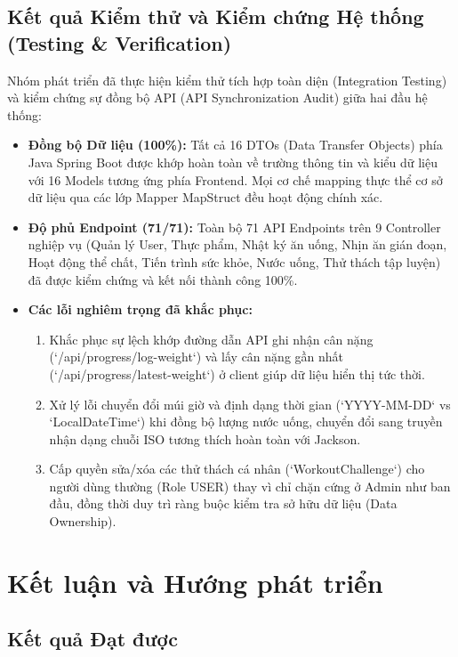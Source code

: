 \documentclass[12pt,a4paper]{article}
\begin{document}
\subsection{Kết quả Kiểm thử và Kiểm chứng Hệ thống (Testing \& Verification)}

Nhóm phát triển đã thực hiện kiểm thử tích hợp toàn diện (Integration Testing) và kiểm chứng sự đồng bộ API (API Synchronization Audit) giữa hai đầu hệ thống:
\begin{itemize}
    \item \textbf{Đồng bộ Dữ liệu (100\%):} Tất cả 16 DTOs (Data Transfer Objects) phía Java Spring Boot được khớp hoàn toàn về trường thông tin và kiểu dữ liệu với 16 Models tương ứng phía Frontend. Mọi cơ chế mapping thực thể cơ sở dữ liệu qua các lớp Mapper MapStruct đều hoạt động chính xác.
    \item \textbf{Độ phủ Endpoint (71/71):} Toàn bộ 71 API Endpoints trên 9 Controller nghiệp vụ (Quản lý User, Thực phẩm, Nhật ký ăn uống, Nhịn ăn gián đoạn, Hoạt động thể chất, Tiến trình sức khỏe, Nước uống, Thử thách tập luyện) đã được kiểm chứng và kết nối thành công 100\%.
    \item \textbf{Các lỗi nghiêm trọng đã khắc phục:}
    \begin{enumerate}
        \item Khắc phục sự lệch khớp đường dẫn API ghi nhận cân nặng (`/api/progress/log-weight`) và lấy cân nặng gần nhất (`/api/progress/latest-weight`) ở client giúp dữ liệu hiển thị tức thời.
        \item Xử lý lỗi chuyển đổi múi giờ và định dạng thời gian (`YYYY-MM-DD` vs `LocalDateTime`) khi đồng bộ lượng nước uống, chuyển đổi sang truyền nhận dạng chuỗi ISO tương thích hoàn toàn với Jackson.
        \item Cấp quyền sửa/xóa các thử thách cá nhân (`WorkoutChallenge`) cho người dùng thường (Role USER) thay vì chỉ chặn cứng ở Admin như ban đầu, đồng thời duy trì ràng buộc kiểm tra sở hữu dữ liệu (Data Ownership).
    \end{enumerate}
\end{itemize}

\section{Kết luận và Hướng phát triển}

\subsection{Kết quả Đạt được}
\end{document}
